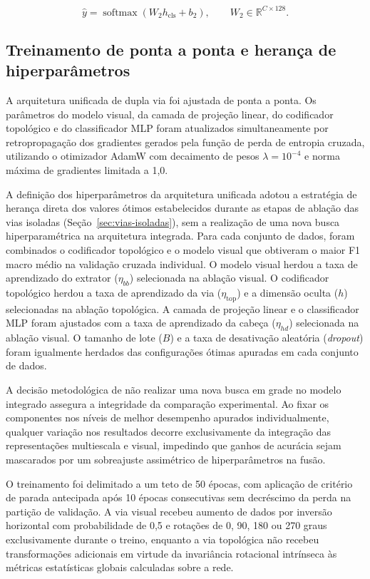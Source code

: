 \begin{equation}
\hat{y} = \operatorname{softmax}\left(W_2 h_{\mathrm{cls}} + b_2\right), \qquad W_2 \in \mathbb{R}^{C \times 128}.
\label{eq:met-mlp-output}
\end{equation}

\subsection{Treinamento de ponta a ponta e herança de hiperparâmetros}
\label{subsec:treino-dupla-via}

A arquitetura unificada de dupla via foi ajustada de ponta a ponta. Os parâmetros do modelo visual, da camada de projeção linear, do codificador topológico e do classificador MLP foram atualizados simultaneamente por retropropagação dos gradientes gerados pela função de perda de entropia cruzada, utilizando o otimizador AdamW com decaimento de pesos $\lambda = 10^{-4}$ e norma máxima de gradientes limitada a 1,0.

A definição dos hiperparâmetros da arquitetura unificada adotou a estratégia de herança direta dos valores ótimos estabelecidos durante as etapas de ablação das vias isoladas (Seção~\ref{sec:vias-isoladas}), sem a realização de uma nova busca hiperparamétrica na arquitetura integrada. Para cada conjunto de dados, foram combinados o codificador topológico e o modelo visual que obtiveram o maior F1 macro médio na validação cruzada individual. O modelo visual herdou a taxa de aprendizado do extrator ($\eta_{bb}$) selecionada na ablação visual. O codificador topológico herdou a taxa de aprendizado da via ($\eta_{\mathrm{top}}$) e a dimensão oculta ($h$) selecionadas na ablação topológica. A camada de projeção linear e o classificador MLP foram ajustados com a taxa de aprendizado da cabeça ($\eta_{hd}$) selecionada na ablação visual. O tamanho de lote ($B$) e a taxa de desativação aleatória (\textit{dropout}) foram igualmente herdados das configurações ótimas apuradas em cada conjunto de dados.

A decisão metodológica de não realizar uma nova busca em grade no modelo integrado assegura a integridade da comparação experimental. Ao fixar os componentes nos níveis de melhor desempenho apurados individualmente, qualquer variação nos resultados decorre exclusivamente da integração das representações multiescala e visual, impedindo que ganhos de acurácia sejam mascarados por um sobreajuste assimétrico de hiperparâmetros na fusão.

O treinamento foi delimitado a um teto de 50 épocas, com aplicação de critério de parada antecipada após 10 épocas consecutivas sem decréscimo da perda na partição de validação. A via visual recebeu aumento de dados por inversão horizontal com probabilidade de 0,5 e rotações de 0, 90, 180 ou 270 graus exclusivamente durante o treino, enquanto a via topológica não recebeu transformações adicionais em virtude da invariância rotacional intrínseca às métricas estatísticas globais calculadas sobre a rede.

